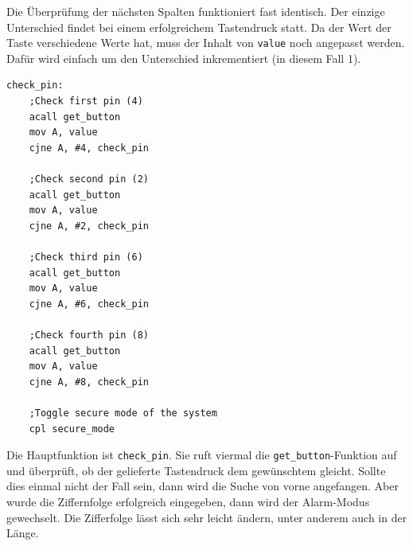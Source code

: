 Die Überprüfung der nächsten Spalten funktioniert fast identisch. Der einzige Unterschied findet bei
einem erfolgreichem Tastendruck statt. Da der Wert der Taste verschiedene Werte hat, muss der Inhalt
von \texttt{value} noch angepasst werden. Dafür wird einfach um den Unterschied inkrementiert (in
diesem Fall 1).

\begin{lstlisting}
check_pin:
    ;Check first pin (4)
    acall get_button
    mov A, value
    cjne A, #4, check_pin

    ;Check second pin (2)
    acall get_button
    mov A, value
    cjne A, #2, check_pin

    ;Check third pin (6)
    acall get_button
    mov A, value
    cjne A, #6, check_pin

    ;Check fourth pin (8)
    acall get_button
    mov A, value
    cjne A, #8, check_pin

    ;Toggle secure mode of the system
    cpl secure_mode
\end{lstlisting}

Die Hauptfunktion ist \texttt{check_pin}. Sie ruft viermal die \texttt{get_button}-Funktion
auf und überprüft, ob der gelieferte Tastendruck dem gewünschtem gleicht. Sollte dies einmal nicht
der Fall sein, dann wird die Suche von vorne angefangen. Aber wurde die Ziffernfolge erfolgreich
eingegeben, dann wird der Alarm-Modus gewechselt. Die Zifferfolge lässt sich sehr leicht ändern,
unter anderem auch in der Länge.